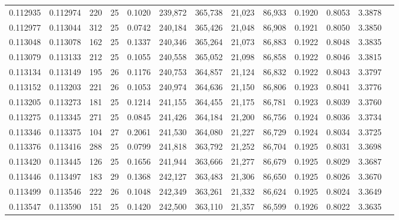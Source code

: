\begin{tabular}{rrrrrrrrrrrrr}
0.112935 & 0.112974 & 220 &  25 &                                     0.1020 & 239,872 & 365,738 &  21,023 &  86,933 & 0.1920 & 0.8053 & 3.3878 \\
0.112977 & 0.113044 & 312 &  25 &                                     0.0742 & 240,184 & 365,426 &  21,048 &  86,908 & 0.1921 & 0.8050 & 3.3850 \\
0.113048 & 0.113078 & 162 &  25 &                                     0.1337 & 240,346 & 365,264 &  21,073 &  86,883 & 0.1922 & 0.8048 & 3.3835 \\
0.113079 & 0.113133 & 212 &  25 &                                     0.1055 & 240,558 & 365,052 &  21,098 &  86,858 & 0.1922 & 0.8046 & 3.3815 \\
0.113134 & 0.113149 & 195 &  26 &                                     0.1176 & 240,753 & 364,857 &  21,124 &  86,832 & 0.1922 & 0.8043 & 3.3797 \\
0.113152 & 0.113203 & 221 &  26 &                                     0.1053 & 240,974 & 364,636 &  21,150 &  86,806 & 0.1923 & 0.8041 & 3.3776 \\
0.113205 & 0.113273 & 181 &  25 &                                     0.1214 & 241,155 & 364,455 &  21,175 &  86,781 & 0.1923 & 0.8039 & 3.3760 \\
0.113275 & 0.113345 & 271 &  25 &                                     0.0845 & 241,426 & 364,184 &  21,200 &  86,756 & 0.1924 & 0.8036 & 3.3734 \\
0.113346 & 0.113375 & 104 &  27 &                                     0.2061 & 241,530 & 364,080 &  21,227 &  86,729 & 0.1924 & 0.8034 & 3.3725 \\
0.113376 & 0.113416 & 288 &  25 &                                     0.0799 & 241,818 & 363,792 &  21,252 &  86,704 & 0.1925 & 0.8031 & 3.3698 \\
0.113420 & 0.113445 & 126 &  25 &                                     0.1656 & 241,944 & 363,666 &  21,277 &  86,679 & 0.1925 & 0.8029 & 3.3687 \\
0.113446 & 0.113497 & 183 &  29 &                                     0.1368 & 242,127 & 363,483 &  21,306 &  86,650 & 0.1925 & 0.8026 & 3.3670 \\
0.113499 & 0.113546 & 222 &  26 &                                     0.1048 & 242,349 & 363,261 &  21,332 &  86,624 & 0.1925 & 0.8024 & 3.3649 \\
0.113547 & 0.113590 & 151 &  25 &                                     0.1420 & 242,500 & 363,110 &  21,357 &  86,599 & 0.1926 & 0.8022 & 3.3635 \\

\end{tabular}
